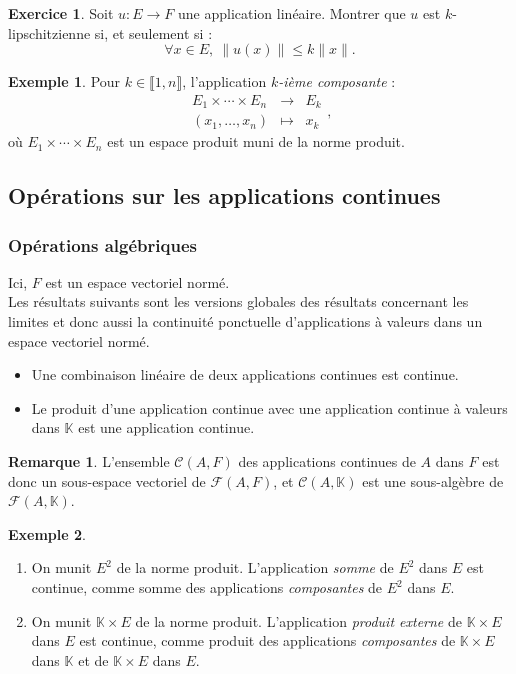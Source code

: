 \documentclass[french]{article}
\newcommand{\K}{\mathbb{K}}
\theoremstyle{plain}
\theoremstyle{definition}
\newtheorem*{ex}{Exemple}
\newtheorem{exo}{Exercice}
\newtheorem*{rmq}{Remarque}
\theoremstyle{remark}
\begin{document}
\begin{exo}
	Soit $u:E\to F$ une application linéaire. Montrer que $u$ est $k$-lipschitzienne si, et seulement si : $$\forall x\in E,\ \lVert u(x)\rVert\leqslant k\lVert x\rVert.$$
\end{exo}

\begin{ex}
	Pour $k\in\llbracket1,n\rrbracket$, l'application \textit{$k$-ième composante} : $$\begin{array}{rcl}
		E_1\times\cdots\times E_n&\longrightarrow&E_k\\
		(x_1,\ldots,x_n)&\longmapsto&x_k
	\end{array},$$ où $E_1\times\cdots\times E_n$ est un espace produit muni de la norme produit.
\end{ex}

\subsection{Opérations sur les applications continues}

\subsubsection*{Opérations algébriques}
Ici, $F$ est un espace vectoriel normé.\\
Les résultats suivants sont les versions globales des résultats concernant les limites et donc aussi la continuité ponctuelle d'applications à valeurs dans un espace vectoriel normé.

\begin{thm}{}%
	\begin{itemize}
		\item Une combinaison linéaire de deux applications continues est continue.
		\item Le produit d'une application continue avec une application continue à valeurs dans $\K$ est une application continue.
	\end{itemize}
\end{thm}

\begin{rmq}
	L'ensemble $\mathcal{C}(A,F)$ des applications continues de $A$ dans $F$ est donc un sous-espace vectoriel de $\mathcal{F}(A,F)$, et $\mathcal{C}(A,\K)$ est une sous-algèbre de $\mathcal{F}(A,\K)$.
\end{rmq}

\begin{ex}
	\begin{enumerate}
		\item On munit $E^2$ de la norme produit. L'application \textit{somme} de $E^2$ dans $E$ est continue, comme somme des applications \textit{composantes} de $E^2$ dans $E$.
		\item On munit $\K\times E$ de la norme produit. L'application \textit{produit externe} de $\K\times E$ dans $E$ est continue, comme produit des applications \textit{composantes} de $\K\times E$ dans $\K$ et de $\K\times E$ dans $E$.
	\end{enumerate}
\end{ex}
\end{document}
